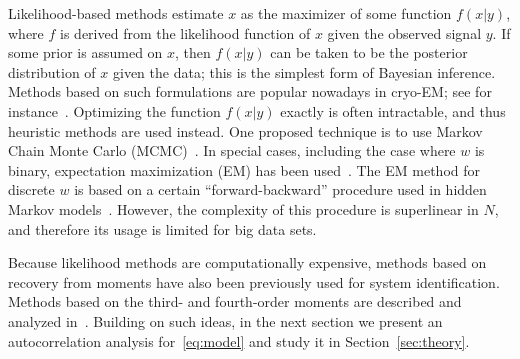 \documentclass[9pt,twocolumn,twoside,lineno]{pnas-new}
\begin{document}
Likelihood-based methods estimate $x$ as the maximizer of some function $f(x | y)$, where $f$ is derived from the likelihood function of $x$ given the observed signal $y$. %
If some prior is assumed on $x$, then $f(x|y)$ can be taken to be the posterior distribution of $x$ given the data; this is the simplest form of Bayesian inference.
Methods based on such formulations are popular nowadays in cryo-EM; see for instance~\cite{sigworth1998maximum,scheres2012relion}. 
Optimizing the function $f(x|y)$ exactly is often intractable, and thus heuristic methods are used instead. One proposed technique is to use Markov Chain Monte Carlo (MCMC)~\cite{cappe1999simulation}. %
In special cases, including the case where $w$ is binary, expectation maximization (EM) has been used~\cite{cappe1999simulation}. The EM method for discrete $w$ is based on a certain ``forward-backward'' procedure used in hidden Markov models~\cite{rabiner1989tutorial}. However, the complexity of this procedure is superlinear in $N$, and therefore its usage is limited for big data sets. 
%

Because likelihood methods are computationally expensive, methods based on recovery from moments have also been previously used for system identification. Methods based on the third- and fourth-order moments are described and analyzed in~\cite{lii1982deconvolution,giannakis1989identification,tugnait1984identification}. Building on such ideas, in the next section we present an autocorrelation analysis for~\eqref{eq:model} and study it in Section~\ref{sec:theory}.  
\end{document}
